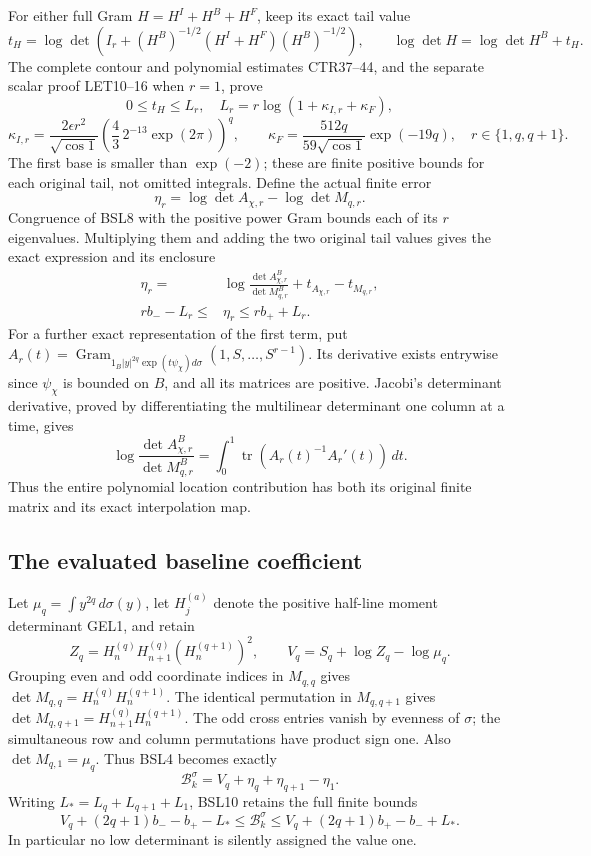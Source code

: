 \documentclass[11pt,a4paper]{article}
\begin{document}
For either full Gram $H=H^I+H^B+H^F$, keep its exact tail value
\[
 t_H=\log\det\left(I_r+(H^B)^{-1/2}
                       (H^I+H^F)(H^B)^{-1/2}\right),\qquad
 \log\det H=\log\det H^B+t_H.
\]
The complete contour and polynomial estimates CTR37--44, and the
separate scalar proof LET10--16 when $r=1$, prove
\[
 0\leq t_H\leq L_r,
 \quad L_r=r\log(1+\kappa_{I,r}+\kappa_F),
\]
\[
 \kappa_{I,r}=\frac{2\epsilon r^2}{\sqrt{\cos1}}
       \left(\frac43\,2^{-13}\exp(2\pi)\right)^q,
 \qquad \kappa_F=\frac{512q}{59\sqrt{\cos1}}\exp(-19q),
 \quad r\in\{1,q,q+1\}.
 \tag{BSL9}
\]
The first base is smaller than $\exp(-2)$; these are finite
positive bounds for each original tail, not omitted integrals.
Define the actual finite error
\[
 \eta_r=\log\det A_{\chi,r}-\log\det M_{q,r}.
\]
Congruence of BSL8 with the positive power Gram bounds each of its
$r$ eigenvalues. Multiplying them and adding the two original tail
values gives the exact expression and its enclosure
\[
 \begin{split}
 \eta_r={}&\log\frac{\det A_{\chi,r}^B}{\det M_{q,r}^B}
                 +t_{A_{\chi,r}}-t_{M_{q,r}},\\
 rb_- -L_r\leq{}&\eta_r\leq rb_++L_r.
 \end{split}
 \tag{BSL10}
\]
For a further exact representation of the first term, put
$A_r(t)=\operatorname{Gram}_{1_B|y|^{2q}\exp(t\psi_\chi)d\sigma}
(1,S,\ldots,S^{r-1})$. Its derivative exists entrywise since
$\psi_\chi$ is bounded on $B$, and all its matrices are positive.
Jacobi's determinant derivative, proved by differentiating the
multilinear determinant one column at a time, gives
\[
 \log\frac{\det A_{\chi,r}^B}{\det M_{q,r}^B}
    =\int_0^1\operatorname{tr}(A_r(t)^{-1}A_r'(t))\,dt.
 \tag{BSL11}
\]
Thus the entire polynomial location contribution has both its original
finite matrix and its exact interpolation map.

\subsection{The evaluated baseline coefficient}
Let $\mu_q=\int y^{2q}\,d\sigma(y)$, let $H_j^{(a)}$ denote the
positive half-line moment determinant GEL1, and retain
\[
 Z_q=H_n^{(q)}H_{n+1}^{(q)}(H_n^{(q+1)})^2,
 \qquad V_q=S_q+\log Z_q-\log\mu_q.
 \tag{BSL12}
\]
Grouping even and odd coordinate indices in $M_{q,q}$ gives
$\det M_{q,q}=H_n^{(q)}H_n^{(q+1)}$.
The identical permutation in $M_{q,q+1}$ gives
$\det M_{q,q+1}=H_{n+1}^{(q)}H_n^{(q+1)}$.
The odd cross entries vanish by evenness of $\sigma$; the simultaneous
row and column permutations have product sign one. Also
$\det M_{q,1}=\mu_q$. Thus BSL4 becomes exactly
\[
 \boxed{\mathcal B_k^\sigma=V_q+\eta_q+\eta_{q+1}-\eta_1.}
 \tag{BSL13}
\]
Writing $L_*=L_q+L_{q+1}+L_1$, BSL10 retains the full finite bounds
\[
 \boxed{V_q+(2q+1)b_- -b_+-L_*
       \leq\mathcal B_k^\sigma
       \leq V_q+(2q+1)b_+-b_-+L_*.}
 \tag{BSL14}
\]
In particular no low determinant is silently assigned the value one.
\end{document}
